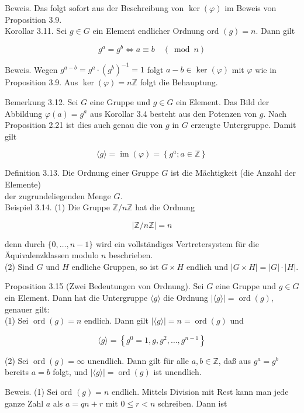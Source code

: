\documentclass[10pt, letterpaper]{article}
\begin{document}
Beweis. Das folgt sofort aus der Beschreibung von $\operatorname{ker}(\varphi)$ im Beweis von Proposition 3.9.\\
Korollar 3.11. Sei $g \in G$ ein Element endlicher Ordnung ord $(g)=n$. Dann gilt

$$
g^{a}=g^{b} \Longleftrightarrow a \equiv b \quad(\bmod n)
$$

Beweis. Wegen $g^{a-b}=g^{a} \cdot\left(g^{b}\right)^{-1}=1$ folgt $a-b \in \operatorname{ker}(\varphi)$ mit $\varphi$ wie in Proposition 3.9. Aus $\operatorname{ker}(\varphi)=n \mathbb{Z}$ folgt die Behauptung.

Bemerkung 3.12. Sei $G$ eine Gruppe und $g \in G$ ein Element. Das Bild der Abbildung $\varphi(a)=g^{a}$ aus Korollar 3.4 besteht aus den Potenzen von $g$. Nach Proposition 2.21 ist dies auch genau die von $g$ in $G$ erzeugte Untergruppe. Damit gilt

$$
\langle g\rangle=\operatorname{im}(\varphi)=\left\{g^{a} ; a \in \mathbb{Z}\right\}
$$

Definition 3.13. Die Ordnung einer Gruppe $G$ ist die Mächtigkeit (die Anzahl der Elemente)\\
der zugrundeliegenden Menge $G$.\\
Beispiel 3.14. (1) Die Gruppe $\mathbb{Z} / n \mathbb{Z}$ hat die Ordnung

$$
|\mathbb{Z} / n \mathbb{Z}|=n
$$

denn durch $\{0, \ldots, n-1\}$ wird ein vollständiges Vertretersystem für die Äquivalenzklassen modulo $n$ beschrieben.\\
(2) Sind $G$ und $H$ endliche Gruppen, so ist $G \times H$ endlich und $|G \times H|=|G| \cdot|H|$.

Proposition 3.15 (Zwei Bedeutungen von Ordnung). Sei $G$ eine Gruppe und $g \in G$ ein Element. Dann hat die Untergruppe $\langle g\rangle$ die Ordnung $|\langle g\rangle|=\operatorname{ord}(g)$, genauer gilt:\\
(1) Sei $\operatorname{ord}(g)=n$ endlich. Dann gilt $|\langle g\rangle|=n=\operatorname{ord}(g)$ und

$$
\langle g\rangle=\left\{g^{0}=1, g, g^{2}, \ldots, g^{n-1}\right\}
$$

(2) Sei $\operatorname{ord}(g)=\infty$ unendlich. Dann gilt für alle $a, b \in \mathbb{Z}$, daß aus $g^{a}=g^{b}$ bereits $a=b$ folgt, und $|\langle g\rangle|=\operatorname{ord}(g)$ ist unendlich.

Beweis. (1) Sei ord $(g)=n$ endlich. Mittels Division mit Rest kann man jede ganze Zahl $a$ als $a=q n+r$ mit $0 \leq r<n$ schreiben. Dann ist
\end{document}
